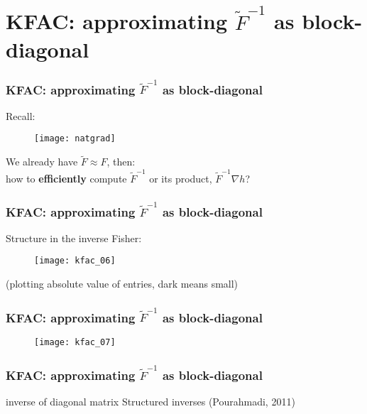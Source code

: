 \section{KFAC: approximating $\tilde{F}^{-1}$ as block-diagonal}

\begin{frame}
\frametitle{KFAC: approximating $\tilde{F}^{-1}$ as block-diagonal}
Recall:
\begin{figure}
    \centering
    \texttt{[image: natgrad]}
\end{figure}

We already have $\tilde{F} \approx F$, then: \\
how to \textbf{efficiently} compute $\tilde{F}^{-1}$ or its product, $\tilde{F}^{-1}\nabla h$?
\end{frame}

\begin{frame}
\frametitle{KFAC: approximating $\tilde{F}^{-1}$ as block-diagonal}
Structure in the inverse Fisher:
\begin{figure}
    \centering
    \texttt{[image: kfac\_06]}
\end{figure}
(plotting absolute value of entries, dark means small)
\end{frame}

\begin{frame}
\frametitle{KFAC: approximating $\tilde{F}^{-1}$ as block-diagonal}
\begin{figure}
    \centering
    \texttt{[image: kfac\_07]}
\end{figure}
\end{frame}

\begin{frame}
\frametitle{KFAC: approximating $\tilde{F}^{-1}$ as block-diagonal}
inverse of diagonal matrix
Structured inverses (Pourahmadi, 2011)

\end{frame}
